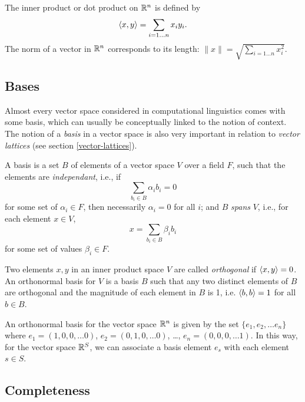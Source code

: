 \documentclass[12pt]{report}
\begin{document}
\begin{example}
The inner product or dot product on $\mathbb{R}^n$ is defined by
$$\langle x, y \rangle  = \sum_{i = 1\ldots n} x_iy_i.$$
The norm of a vector in $\mathbb{R}^n$ corresponds to its length: $\|x\| = \sqrt{\sum_{i=1\ldots n} x_i^2}$.
\end{example}

\subsection{Bases}

Almost every vector space considered in computational linguistics comes with some basis, which can usually be conceptually linked to the notion of context. The notion of a \emph{basis} in a vector space is also very important in relation to \emph{vector lattices} (see section \ref{vector-lattices}).

\begin{defn}[Basis]
A basis is a set $B$ of elements of a vector space $V$ over a field $F$, such that the elements are \emph{independant}, i.e., if
$$\sum_{b_i \in B} \alpha_i b_i = 0$$
for some set of $\alpha_i \in F$, then necessarily $\alpha_i = 0$ for all $i$; and $B$ \emph{spans} $V$, i.e., for each element $x \in V$,
$$x = \sum_{b_i \in B} \beta_i b_i$$
for some set of values $\beta_i \in F$.

Two elements $x,y$ in an inner product space $V$ are called \emph{orthogonal} if $\langle x, y \rangle = 0$. An orthonormal basis for $V$ is a basis $B$ such that any two distinct elements of $B$ are orthogonal and the magnitude of each element in $B$ is 1, i.e. $\langle b, b \rangle = 1$ for all $b\in B$.
\end{defn}

\begin{example}
An orthonormal basis for the vector space $\mathbb{R}^n$ is given by the set $\{e_1,e_2,\ldots e_n\}$ where $e_1 = (1,0,0,\dots 0)$, $e_2 = (0,1,0,\dots 0)$, \ldots, $e_n = (0,0,0,\dots 1)$. In this way, for the vector space $\mathbb{R}^S$, we can associate a basis element $e_s$ with each element $s \in S$.
\end{example}

\subsection{Completeness}
\end{document}
